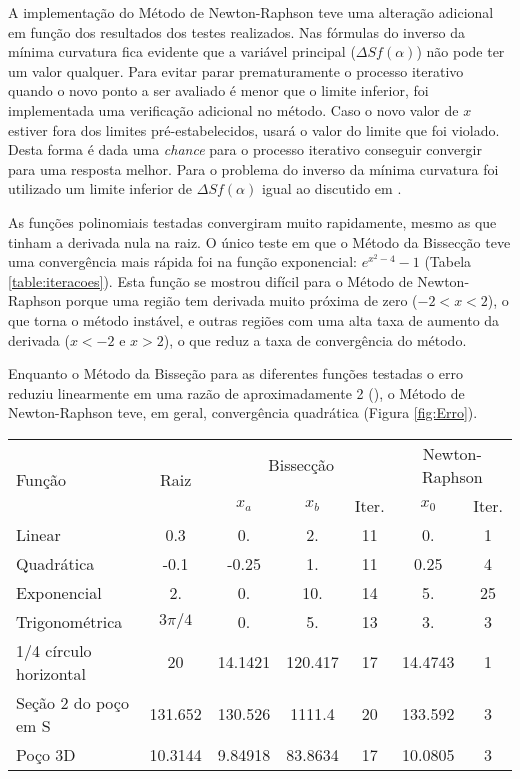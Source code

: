 \documentclass[final,5p]{elsarticle}
\numberwithin{equation}{section}
\begin{document}
    A implementação do Método de Newton-Raphson teve uma alteração adicional em função dos resultados dos testes realizados. Nas fórmulas do inverso da mínima curvatura fica evidente que a variável principal ($\Delta S f(\alpha)$) não pode ter um valor qualquer. Para evitar parar prematuramente o processo iterativo quando o novo ponto a ser avaliado é menor que o limite inferior, foi implementada uma verificação adicional no método. Caso o novo valor de $x$ estiver fora dos limites pré-estabelecidos, usará o valor do limite que foi violado. Desta forma é dada uma \emph{chance} para o processo iterativo conseguir convergir para uma resposta melhor. Para o problema do inverso da mínima curvatura foi utilizado um limite inferior de $\Delta S f(\alpha)$ igual ao discutido em \cite{relatoriobisseccao}.

    As funções polinomiais testadas convergiram muito rapidamente, mesmo as que tinham a derivada nula na raiz. O único teste em que o Método da Bissecção teve uma convergência mais rápida foi na função exponencial: $e^{x^2-4}-1$ (Tabela \ref{table:iteracoes}). Esta função se mostrou difícil para o Método de Newton-Raphson porque uma região tem derivada muito próxima de zero ($-2<x<2$), o que torna o método instável, e outras regiões com uma alta taxa de aumento da derivada ($x<-2$ e $x>2$), o que reduz a taxa de convergência do método. 
    
    Enquanto o Método da Bisseção para as diferentes funções testadas o erro reduziu linearmente em uma razão de aproximadamente 2 (\cite{relatoriobisseccao}), o Método de Newton-Raphson teve, em geral, convergência quadrática (Figura \ref{fig:Erro}). 

    \begin{table*} 
        \caption{Comparação entre o número de iterações necessários para um mesmo critério de convergência usando os Métodos da Bissecção e Newton-Raphson.}
        \begin{tabular}{ l c c c c c c }
            \hline
            \multirow{2}{*}{Função} & \multirow{2}{*}{Raiz} & \multicolumn{3}{c}{Bissecção} & \multicolumn{2}{c}{Newton-Raphson} \\
            &  & $x_a$ & $x_b$ & Iter. & $x_0$ & Iter. \\ 
            \hline
            Linear & 0.3 & 0. & 2. &  11 & 0. & 1\\
            Quadrática & -0.1 & -0.25 & 1. & 11 & 0.25 & 4  \\
            Exponencial  & 2. & 0. & 10. & 14 & 5. & 25 \\
            Trigonométrica & $3\pi/4$ & 0. & 5. & 13 & 3. & 3  \\
            1/4 círculo horizontal & 20 & 14.1421 & 120.417 & 17 & 14.4743 & 1 \\
            Seção 2 do poço em S & 131.652 & 130.526 & 1111.4 & 20 & 133.592 & 3 \\
            Poço 3D & 10.3144 & 9.84918 & 83.8634 & 17 & 10.0805 & 3 \\
            \hline
        \end{tabular}
        \label{table:iteracoes}
    \end{table*}
    
\end{document}

